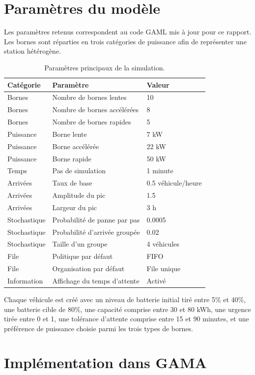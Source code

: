 \documentclass[11pt]{article}
\begin{document}
\section{Paramètres du modèle}\label{sec:parametres}

Les paramètres retenus correspondent au code GAML mis à jour pour ce rapport. Les bornes sont réparties en trois catégories de puissance afin de représenter une station hétérogène.

\begin{table}[H]
\centering
\caption{Paramètres principaux de la simulation.}
\label{tab:parametres}
\begin{tabular}{@{}lll@{}}
\toprule
Catégorie & Paramètre & Valeur \\
\midrule
Bornes & Nombre de bornes lentes & 10 \\
Bornes & Nombre de bornes accélérées & 8 \\
Bornes & Nombre de bornes rapides & 5 \\
Puissance & Borne lente & 7 kW \\
Puissance & Borne accélérée & 22 kW \\
Puissance & Borne rapide & 50 kW \\
Temps & Pas de simulation & 1 minute \\
Arrivées & Taux de base & 0.5 véhicule/heure \\
Arrivées & Amplitude du pic & 1.5 \\
Arrivées & Largeur du pic & 3 h \\
Stochastique & Probabilité de panne par pas & 0.0005 \\
Stochastique & Probabilité d'arrivée groupée & 0.02 \\
Stochastique & Taille d'un groupe & 4 véhicules \\
File & Politique par défaut & FIFO \\
File & Organisation par défaut & File unique \\
Information & Affichage du temps d'attente & Activé \\
\bottomrule
\end{tabular}
\end{table}

Chaque véhicule est créé avec un niveau de batterie initial tiré entre 5\% et 40\%, une batterie cible de 80\%, une capacité comprise entre 30 et 80 kWh, une urgence tirée entre 0 et 1, une tolérance d'attente comprise entre 15 et 90 minutes, et une préférence de puissance choisie parmi les trois types de bornes.
\newpage
\section{Implémentation dans GAMA}\label{sec:implementation}
\end{document}
